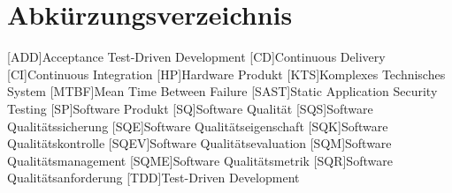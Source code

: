 \chapter*{Abkürzungsverzeichnis}
\label{ch:acronym}

\begin{acronym}
    [ADD]{Acceptance Test-Driven Development}
    [CD]{Continuous Delivery}
    [CI]{Continuous Integration}
    [HP]{Hardware Produkt}
    [KTS]{Komplexes Technisches System}
    [MTBF]{Mean Time Between Failure}
    [SAST]{Static Application Security Testing}
    [SP]{Software Produkt}
    [SQ]{Software Qualität}
    [SQS]{Software Qualitätssicherung}
    [SQE]{Software Qualitätseigenschaft}
    [SQK]{Software Qualitätskontrolle}
    [SQEV]{Software Qualitätsevaluation}
    [SQM]{Software Qualitätsmanagement}
    [SQME]{Software Qualitätsmetrik}
    [SQR]{Software Qualitätsanforderung}
    [TDD]{Test-Driven Development}
\end{acronym}
